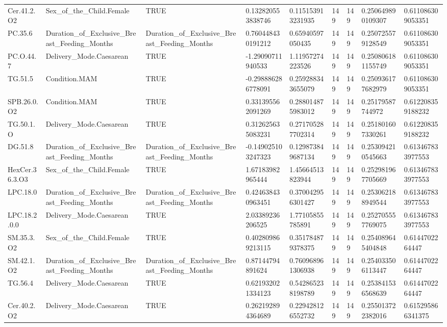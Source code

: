 \begin{longtable}{lllllllll}
Cer.41.2.O2 & Sex\_of\_the\_Child.Female & TRUE & 0.132820553838746 & 0.115153913231935 & 149 & 149 & 0.250649890109307 & 0.611086309053351 \\
PC.35.6 & Duration\_of\_Exclusive\_Breast\_Feeding\_Months & Duration\_of\_Exclusive\_Breast\_Feeding\_Months & 0.760448430191212 & 0.65940597050435 & 149 & 149 & 0.250725579128549 & 0.611086309053351 \\
PC.O.44.7 & Delivery\_Mode.Caesarean & TRUE & -1.29090711940533 & 1.11957274223526 & 149 & 149 & 0.250806181155749 & 0.611086309053351 \\
TG.51.5 & Condition.MAM & TRUE & -0.298886286778091 & 0.259288343655079 & 149 & 149 & 0.250936177682979 & 0.611086309053351 \\
SPB.26.0.O2 & Condition.MAM & TRUE & 0.331395562091269 & 0.288014875983012 & 149 & 149 & 0.25179587744972 & 0.612208359188232 \\
TG.50.1.O & Delivery\_Mode.Caesarean & TRUE & 0.312625635083231 & 0.271705287702314 & 149 & 149 & 0.251801607330261 & 0.612208359188232 \\
DG.51.8 & Duration\_of\_Exclusive\_Breast\_Feeding\_Months & Duration\_of\_Exclusive\_Breast\_Feeding\_Months & -0.149025103247323 & 0.129873849687134 & 149 & 149 & 0.253094210545663 & 0.613467833977553 \\
HexCer.36.3.O3 & Sex\_of\_the\_Child.Female & TRUE & 1.67183982965444 & 1.45664513823944 & 149 & 149 & 0.252981967705669 & 0.613467833977553 \\
LPC.18.0 & Duration\_of\_Exclusive\_Breast\_Feeding\_Months & Duration\_of\_Exclusive\_Breast\_Feeding\_Months & 0.424638430963451 & 0.370042956301427 & 149 & 149 & 0.253062188949544 & 0.613467833977553 \\
LPC.18.2.0.0 & Delivery\_Mode.Caesarean & TRUE & 2.03389236206525 & 1.77105855785891 & 149 & 149 & 0.252705557769075 & 0.613467833977553 \\
SM.35.3.O2 & Sex\_of\_the\_Child.Female & TRUE & 0.402809869213115 & 0.351784879378375 & 149 & 149 & 0.254089645404848 & 0.6144702264447 \\
SM.42.1.O2 & Duration\_of\_Exclusive\_Breast\_Feeding\_Months & Duration\_of\_Exclusive\_Breast\_Feeding\_Months & 0.87144794891624 & 0.760968961306938 & 149 & 149 & 0.254033506113447 & 0.6144702264447 \\
TG.56.4 & Delivery\_Mode.Caesarean & TRUE & 0.621932021334123 & 0.542865238198789 & 149 & 149 & 0.253841536568639 & 0.6144702264447 \\
Cer.40.2.O2 & Delivery\_Mode.Caesarean & TRUE & 0.262192894364689 & 0.229428126552732 & 149 & 149 & 0.255013722382016 & 0.615295866341375 \\

\end{longtable}
